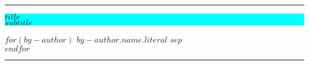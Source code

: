 %
%
%
% 

\thispagestyle{empty} %

\textcolor{blue}{\rule{10pt}{\textheight}} %




\colorbox{cyan}{
	\parbox[t]{0.93\textwidth}{ %
		\parbox[t]{0.91\textwidth}{ %
			\raggedright %
			\fontsize{50pt}{80pt}\selectfont %
			\vspace{0.7cm} %
			
			$title$\\
			\fontsize{25pt}{40pt}\selectfont
			$subtitle$\\
			
			\vspace{0.7cm} %
		}
	}
}

\vfill %


\parbox[t]{0.93\textwidth}{ %
	\raggedleft %
	\large %
$for(by-author)$%
{\Large $by-author.name.literal$}%
$sep$\\ %
$endfor$%
	
	\hfill\rule{0.2\linewidth}{1pt}%
}
